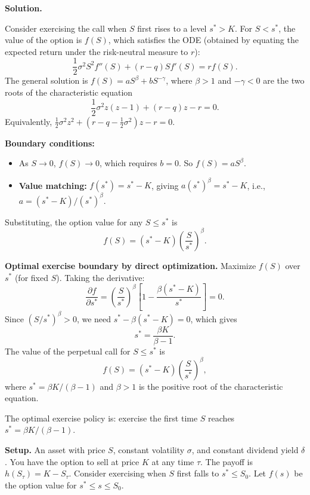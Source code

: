 \baselineskip
\textbf{Solution.}

Consider exercising the call when $S$ first rises to a level $s^* > K$.  For $S < s^*$, the value of the option is $f(S)$, which satisfies the ODE (obtained by equating the expected return under the risk-neutral measure to $r$):
$$\frac{1}{2}\sigma^2 S^2 f''(S) + (r - q)S f'(S) = r f(S).$$
The general solution is $f(S) = aS^\beta + bS^{-\gamma}$, where $\beta > 1$ and $-\gamma < 0$ are the two roots of the characteristic equation
$$\frac{1}{2}\sigma^2 z(z-1) + (r-q)z - r = 0.$$
Equivalently, $\frac{1}{2}\sigma^2 z^2 + (r - q - \frac{1}{2}\sigma^2)z - r = 0$.

\textbf{Boundary conditions:}
\begin{itemize}
\item As $S \to 0$, $f(S) \to 0$, which requires $b = 0$.  So $f(S) = aS^\beta$.
\item \textbf{Value matching:} $f(s^*) = s^* - K$, giving $a(s^*)^\beta = s^* - K$, i.e., $a = (s^* - K)/(s^*)^\beta$.
\end{itemize}

Substituting, the option value for any $S \le s^*$ is
$$f(S) = (s^* - K)\left(\frac{S}{s^*}\right)^\beta.$$

\textbf{Optimal exercise boundary by direct optimization.}  Maximize $f(S)$ over $s^*$ (for fixed $S$).  Taking the derivative:
$$\frac{\partial f}{\partial s^*} = \left(\frac{S}{s^*}\right)^\beta\!\left[1 - \frac{\beta(s^* - K)}{s^*}\right] = 0.$$
Since $(S/s^*)^\beta > 0$, we need $s^* - \beta(s^* - K) = 0$, which gives
$$s^* = \frac{\beta K}{\beta - 1}.$$
The value of the perpetual call for $S \le s^*$ is
$$f(S) = (s^* - K)\left(\frac{S}{s^*}\right)^\beta,$$
where $s^* = \beta K/(\beta - 1)$ and $\beta > 1$ is the positive root of the characteristic equation.

The optimal exercise policy is: exercise the first time $S$ reaches $s^* = \beta K/(\beta - 1)$.


\textbf{Setup.}  An asset with price $S$, constant volatility $\sigma$, and constant dividend yield $\delta$.  You have the option to sell at price $K$ at any time $\tau$.  The payoff is $h(S_\tau) = K - S_\tau$.  Consider exercising when $S$ first falls to $s^* \le S_0$.  Let $f(s)$ be the option value for $s^* \le s \le S_0$.

